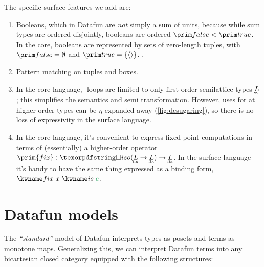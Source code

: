 \documentclass{rntz}\usepackage[a5]{rntzgeometry}\usepackage[fullwidth=130mm,width=330pt,]{narrow}
\begin{document}
The specific surface features we add are:
\begin{enumerate}
\item Booleans, which in Datafun are \emph{not} simply a sum of units, because
  while sum types are ordered disjointly, booleans are ordered $\efalse <
  \etrue$. In the core, booleans are represented by sets of zero-length tuples,
  with $\efalse = \emptyset$ and $\etrue = \eset{\etuple{}}$. .

\item Pattern matching on tuples and boxes. 

\item In the core language, -loops are limited to only first-order
  semilattice types $\eqt L$; this simplifies the semantics and semi\naive{}
  transformation. However, uses for  at higher-order types can be
  $\eta$-expanded away (\cref{fig:desugaring}), so there is no loss of
  expressivity in the surface language.

\item In the core language, it's convenient to express fixed point computations
  in terms of (essentially) a higher-order operator $\prim{fix} : \isof{(\fixt L
    \to \fixt L)} \to \fixt L$. In the surface language it's handy to have the
  same thing expressed as a binding form, $\efixisd x e$.

\end{enumerate}


\section{Datafun models}
\label{sec:datafun-models}

The \emph{``standard''} model of Datafun interprets types as posets and terms as
monotone maps. Generalizing this, we can interpret Datafun terms into any
bicartesian closed category \catC{} equipped with the following structures:
\end{document}

